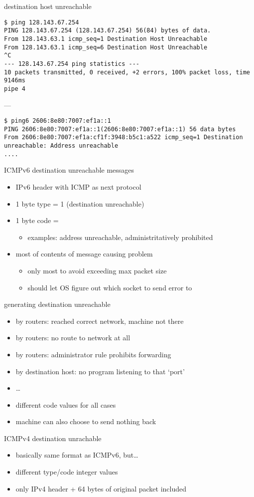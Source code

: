 \begin{frame}[fragile]{destination host unreachable}
\begin{Verbatim}
$ ping 128.143.67.254
PING 128.143.67.254 (128.143.67.254) 56(84) bytes of data.
From 128.143.63.1 icmp_seq=1 Destination Host Unreachable
From 128.143.63.1 icmp_seq=6 Destination Host Unreachable
^C
--- 128.143.67.254 ping statistics ---
10 packets transmitted, 0 received, +2 errors, 100% packet loss, time 9146ms
pipe 4
\end{Verbatim}
---
\begin{Verbatim}
$ ping6 2606:8e80:7007:ef1a::1
PING 2606:8e80:7007:ef1a::1(2606:8e80:7007:ef1a::1) 56 data bytes
From 2606:8e80:7007:ef1a:cf1f:3948:b5c1:a522 icmp_seq=1 Destination unreachable: Address unreachable
....
\end{Verbatim}
\end{frame}

\begin{frame}{ICMPv6 destination unreachable messages}
\begin{itemize}
\item IPv6 header with ICMP as next protocol
\item 1 byte type = 1 (destination unreachable)
\item 1 byte code =
    \begin{itemize}
    \item examples: address unreachable, administritatively prohibited
    \end{itemize}
\item most of contents of message causing problem
    \begin{itemize}
    \item only most to avoid exceeding max packet size
    \item should let OS figure out which socket to send error to
    \end{itemize}
\end{itemize}
\end{frame}

\begin{frame}{generating destination unreachable}
    \begin{itemize}
    \item by routers: reached correct network, machine not there
    \item by routers: no route to network at all
    \item by routers: administrator rule prohibits forwarding
    \item by destination host: no program listening to that `port'
    \item \ldots
    \vspace{.5cm}
    \item different code values for all cases
    \item machine can also choose to send nothing back
    \end{itemize}
\end{frame}

\begin{frame}{ICMPv4 destination unrachable}
\begin{itemize}
\item basically same format as ICMPv6, but\ldots
\item different type/code integer values
\item only IPv4 header + 64 bytes of original packet included
\end{itemize}
\end{frame}
